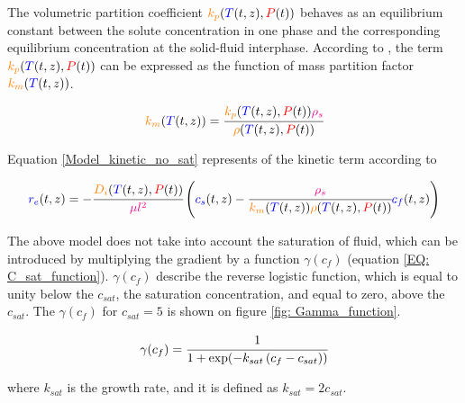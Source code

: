 \documentclass[../Article_Model_Parameters.tex]{subfiles}
\begin{document}
			The volumetric partition coefficient ${\color{orange}k_p}({\color{blue}T}(t,z),{\color{red}P}(t))$ behaves as an equilibrium constant between the solute concentration in one phase and the corresponding equilibrium concentration at the solid-fluid interphase. According to \citet{Spiro2007}, the term ${\color{orange}k_p}({\color{blue}T}(t,z),{\color{red}P}(t))$ can be expressed as the function of mass partition factor ${\color{orange}k_m}({\color{blue}T}(t,z))$.
			
			{\footnotesize
				\begin{align}
					{\color{orange}k_m}({\color{blue}T}(t,z)) = \cfrac{{\color{orange}k_p}({\color{blue}T}(t,z),{\color{red}P}(t)) {\color{magenta}\rho_s}}{{\color{orange}\rho}({\color{blue}T}(t,z),{\color{red}P}(t))}
			\end{align} }
			
			Equation \ref{Model_kinetic_no_sat} represents of the kinetic term according to \citet{Reverchon1996}
			
			{\footnotesize
				\begin{equation}
					\label{Model_kinetic_no_sat}
					{\color{blue}r_e}(t,z) = -\cfrac{{\color{orange}D_i}({\color{blue}T}(t,z), {\color{red}P}(t))}{{\color{magenta} \mu l^2} }\left({\color{blue}c_s}(t,z) - \cfrac{{\color{magenta}\rho_s}}{{\color{orange}k_m}({\color{blue}T}(t,z)){\color{orange}\rho}({\color{blue}T}(t,z),{\color{red}P}(t))}  {\color{blue}c_f}(t,z) \right)
			\end{equation} }

        The above model does not take into account the saturation of fluid, which can be introduced by multiplying the gradient by a function $\gamma(c_f)$ (equation \ref{EQ: C_sat_function}). $\gamma(c_f)$ describe the reverse logistic function, which is equal to unity below the $c_{sat}$, the saturation concentration, and equal to zero, above the $c_{sat}$. The $\gamma(c_f)$ for $c_{sat}=5$ is shown on figure \ref{fig: Gamma_function}.

        {\footnotesize
            \begin{equation}
                \gamma(c_f) = \cfrac{1}{1+\exp ( -k_{sat} \left( c_f - c_{sat} \right) ) }
                \label{EQ: C_sat_function}
            \end{equation}
        }

        where $k_{sat}$ is the growth rate, and it is defined as $k_{sat} = 2c_{sat}$.
        
\end{document}
